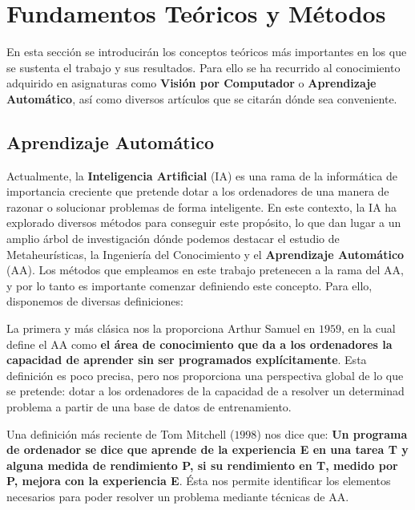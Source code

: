 
\chapter{Fundamentos Teóricos y Métodos}

En esta sección se introducirán los conceptos teóricos más importantes en los que se sustenta el trabajo y sus resultados. Para ello se ha recurrido al conocimiento adquirido en asignaturas como \textbf{Visión por Computador} o \textbf{Aprendizaje Automático}, así como diversos artículos que se citarán dónde sea conveniente.

\section{Aprendizaje Automático}
    \noindent Actualmente, la \textbf{Inteligencia Artificial} (IA) es una rama de la informática de importancia creciente que pretende dotar a los ordenadores de una manera de razonar o solucionar problemas de forma inteligente. En este contexto, la IA ha explorado diversos métodos para conseguir este propósito, lo que dan lugar a un amplio árbol de investigación dónde podemos destacar el estudio de Metaheurísticas, la Ingeniería del Conocimiento y el \textbf{Aprendizaje Automático} (AA). Los métodos que empleamos en este trabajo pretenecen a la rama del AA, y por lo tanto es importante comenzar definiendo este concepto. Para ello, disponemos de diversas definiciones:

    \medskip
    
    \noindent La primera y más clásica nos la proporciona Arthur Samuel en $1959$, en la cual define el AA como \textbf{el área de conocimiento que da a los ordenadores la capacidad de aprender sin ser programados explícitamente}. Esta definición es poco precisa, pero nos proporciona una perspectiva global de lo que se pretende: dotar a los ordenadores de la capacidad de  a resolver un determinad problema a partir de una base de datos de entrenamiento.
    
    \medskip
    
    \noindent Una definición más reciente de Tom Mitchell ($1998$) nos dice que: \textbf{Un programa de ordenador se dice que aprende de la experiencia E en una tarea T y alguna medida de rendimiento P, si su rendimiento en T, medido por P, mejora con la experiencia E}. Ésta nos permite identificar los elementos necesarios para poder resolver un problema mediante técnicas de AA.

    \medskip

